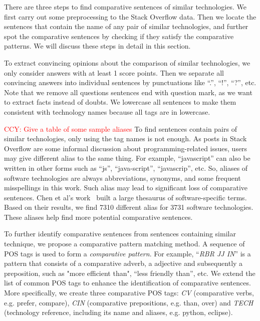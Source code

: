 There are three steps to find comparative sentences of similar technologies.
We first carry out some preprocessing to the Stack Overflow data.
Then we locate the sentences that contain the name of any pair of similar technologies, and further spot the comparative sentences by checking if they satisfy the comparative patterns.
We will discuss these steps in detail in this section.

To extract convincing opinions about the comparison of similar technologies, we only consider answers with at least 1 score points.
Then we separate all convincing answers into individual sentences by punctuations like ``.'',  ``!'', ``?'', etc.
Note that we remove all questions sentences end with question mark, as we want to extract facts instead of doubts.
We lowercase all sentences to make them consistent with technology names because all tags are in lowercase.

\textcolor{red}{CCY: Give a table of some sample aliases}
To find sentences contain pairs of similar technologies, only using the tag names is not enough.
As posts in Stack Overflow are some informal discussion about programming-related issues, users may give different alias to the same thing.
For example, ``javascript'' can also be written in other forms such as ``js'', ``java-script'', ``javascrip'', etc.
So, aliases of software technologies are always abbreviations, synonyms, and some frequent misspellings in this work.
Such alias may lead to significant loss of comparative sentences.
Chen et al's work~\cite{chen2017unsupervised} built a large thesaurus of software-specific terms.
Based on their results, we find 7310 different alias for 3731 software technologies.
These aliases help find more potential comparative sentences.

To further identify comparative sentences from sentences containing similar technique, we propose a comparative pattern matching method. 
A sequence of POS tags is used to form a \textit{comparative pattern}. 
For example, ``\textit{RBR JJ IN}'' is a pattern that consists of a comparative adverb, a adjective and subsequently a preposition, such as "more efficient than", ``less friendly than'', etc. 
We extend the list of common POS tags to enhance the identification of comparative sentences.
More specifically, we create three comparative POS tags: \textit{CV} (comparative verbs, e.g. prefer, compare), \textit{CIN} (comparative prepositions, e.g. than, over) and \textit{TECH} (technology reference, including its name and aliases, e.g. python, eclipse).

